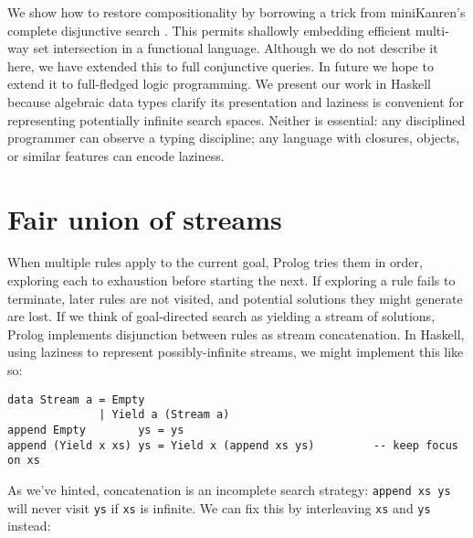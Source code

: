 \documentclass[acmsmall,screen,dvipsnames,svgnames]{acmart}
\newcommand\ttt\texttt
\newcommand\todo[1]{{\color{Orange}#1}}
\renewcommand\todo[1]{{\color{IndianRed}#1}}
\newcommand\XXX{\todo{XXX}}
\renewcommand\todo[1]{\ignorespaces}
\begin{document}
We show how to restore compositionality by borrowing a trick from miniKanren's complete disjunctive search%
.
%
This permits shallowly embedding efficient multi-way set intersection in a functional language.
Although we do not describe it here, we have extended this to full conjunctive queries.
In future we hope to extend it to full-fledged logic programming.
%
We present our work in Haskell because algebraic data types clarify its presentation and laziness is convenient for representing potentially infinite search spaces.
Neither is essential: any disciplined programmer can observe a typing discipline; any language with closures, objects, or similar features can encode laziness.



\section{Fair union of streams}

When multiple rules apply to the current goal, Prolog tries them in order, exploring each to exhaustion before starting the next.
If exploring a rule fails to terminate, later rules are not visited, and potential solutions they might generate are lost.
If we think of goal-directed search as yielding a stream of solutions, Prolog implements disjunction between rules as stream concatenation.
In Haskell, using laziness to represent possibly-infinite streams, we might implement this like so:

\begin{verbatim}
data Stream a = Empty
              | Yield a (Stream a)
append Empty        ys = ys
append (Yield x xs) ys = Yield x (append xs ys)         -- keep focus on xs
\end{verbatim}

\noindent
As we've hinted, concatenation is an incomplete search strategy: \ttt{append xs ys} will never visit \ttt{ys} if \ttt{xs} is infinite.
We can fix this by interleaving \ttt{xs} and \ttt{ys} instead:
\end{document}
